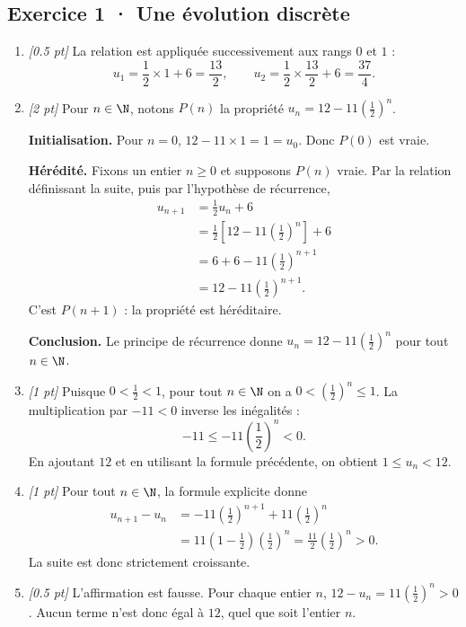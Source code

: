 \subsection*{Exercice 1 · Une évolution discrète}\begin{enumerate}

\item \textit{[\num{0,5} pt]} La relation est appliquée successivement aux rangs $0$ et $1$ :\[u_1=\frac{1}{2}\times 1+6=\frac{13}{2},\qquad u_2=\frac{1}{2}\times \frac{13}{2}+6=\frac{37}{4}.\]

\item \textit{[2 pt]} Pour $n\in\N$, notons $P(n)$ la propriété $u_n=12-11\left(\frac{1}{2}\right)^n$.
\par\smallskip\textbf{Initialisation.} Pour $n=0$, $12-11\times1=1=u_0$. Donc $P(0)$ est vraie.
\par\smallskip\textbf{Hérédité.} Fixons un entier $n\ge0$ et supposons $P(n)$ vraie. Par la relation définissant la suite, puis par l'hypothèse de récurrence,
\[\begin{aligned}u_{n+1}&=\frac{1}{2}u_n+6\\
&=\frac{1}{2}\left[12-11\left(\frac{1}{2}\right)^n\right]+6\\
&=6+6-11\left(\frac{1}{2}\right)^{n+1}\\
&=12-11\left(\frac{1}{2}\right)^{n+1}.
\end{aligned}\]
C'est $P(n+1)$ : la propriété est héréditaire.
\par\smallskip\textbf{Conclusion.} Le principe de récurrence donne $u_n=12-11\left(\frac{1}{2}\right)^n$ pour tout $n\in\N$.

\item \textit{[1 pt]} Puisque $0<\frac{1}{2}<1$, pour tout $n\in\N$ on a $0<(\frac{1}{2})^n\le1$. La multiplication par $-11<0$ inverse les inégalités :
\[-11\le-11(\frac{1}{2})^n<0.\]
En ajoutant $12$ et en utilisant la formule précédente, on obtient $1\le u_n<12$.

\item \textit{[1 pt]} Pour tout $n\in\N$, la formule explicite donne
\[\begin{aligned}u_{n+1}-u_n&=-11(\frac{1}{2})^{n+1}+11(\frac{1}{2})^n\\&=11(1-\frac{1}{2})(\frac{1}{2})^n=\frac{11}{2}(\frac{1}{2})^n>0.\end{aligned}\]
La suite est donc strictement croissante.

\item \textit{[\num{0,5} pt]} L'affirmation est fausse. Pour chaque entier $n$, $12-u_n=11(\frac{1}{2})^n>0$. Aucun terme n'est donc égal à $12$, quel que soit l'entier $n$.

\end{enumerate}

